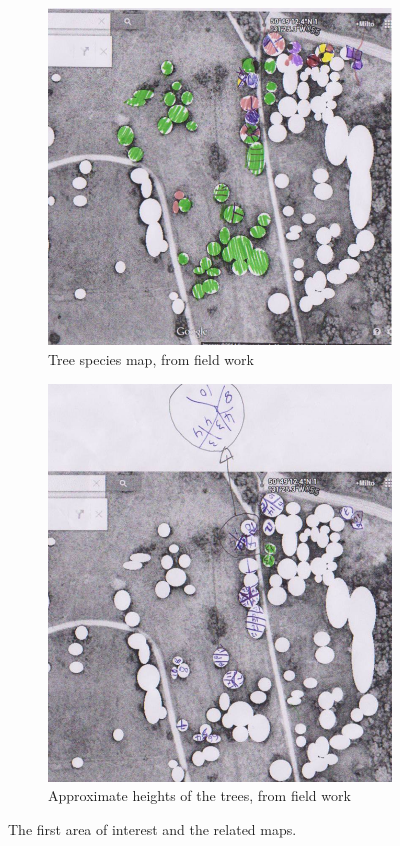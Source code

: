 \documentclass{subfiles}
\begin{document}
\begin{figure} [h!]
\begin{subfigure}[t]{.5\textwidth}
	   		\centering
	   		\includegraphics[width=.9\textwidth]{img/NewForest/Area1Fieldwork_Species}
	   		\caption{Tree species map, from field work}
	   		\label{fig:Area1Fieldwork_Species}
	   	\end{subfigure} \hfill
	   	\begin{subfigure}[t]{.5\textwidth}
	   		\centering
	   		\includegraphics[width=.9\textwidth]{img/NewForest/Area1Fieldwork_Heights}
	   		\caption{Approximate heights of the trees, from field work} 
	   		\label{fig:Area1Fieldwork_Heights}
	   	\end{subfigure}
	   	\caption{The first area of interest and the related maps.} %
	   	\label{fig:NF_Area1} 
	   \end{figure}
	   
\end{document}
